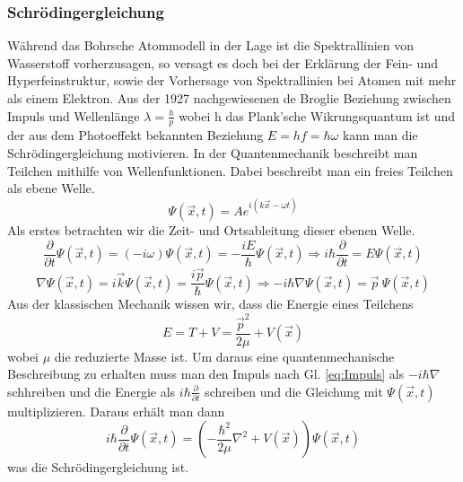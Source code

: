 \documentclass[]{article}
\begin{document}
\subsubsection{Schrödingergleichung}
Während das Bohrsche Atommodell in der Lage ist die Spektrallinien von Wasserstoff vorherzusagen, so versagt es doch bei der Erklärung der Fein- und Hyperfeinstruktur, sowie der Vorhersage von Spektrallinien bei Atomen mit mehr als einem Elektron. Aus der 1927 nachgewiesenen de Broglie Beziehung zwischen Impuls und Wellenlänge $ \lambda=\frac{h}{p} $ wobei h das Plank'sche Wikrungsquantum ist und der aus dem Photoeffekt bekannten Beziehung $ E=hf=\hbar \omega $ kann man die Schrödingergleichung motivieren. In der Quantenmechanik beschreibt man Teilchen mithilfe von Wellenfunktionen. Dabei beschreibt man ein freies Teilchen als ebene Welle.
\begin{equation}
\Psi(\vec{x},t)=A e^{i(k \vec{x}-\omega t)}
\end{equation} 
Als erstes betrachten wir die Zeit- und Ortsableitung dieser ebenen Welle. 
\begin{equation}
\label{eq:Energie} \frac{\partial}{\partial t} \Psi(\vec{x},t)=(-i\omega)  \Psi(\vec{x},t)=-\frac{iE}{\hbar} \Psi(\vec{x},t) \Rightarrow i\hbar \frac{\partial}{\partial t}=E  \Psi(\vec{x},t) \end{equation}
\begin{equation}
\label{eq:Impuls} \nabla  \Psi(\vec{x},t) =i\vec{k} \Psi(\vec{x},t)=\frac{i\vec{p}}{\hbar} \Psi(\vec{x},t) \Rightarrow -i\hbar \nabla  \Psi(\vec{x},t)= \vec{p}    \: \Psi(\vec{x},t) 
\end{equation}
Aus der klassischen Mechanik wissen wir, dass die Energie eines Teilchens \begin{equation} E=T+V=\frac{\vec{p}^2}{2\mu}+V(\vec{x}) 	
\end{equation} 
wobei $\mu$ die reduzierte Masse ist. Um daraus eine quantenmechanische Beschreibung zu erhalten muss man den Impuls nach Gl. \ref{eq:Impuls} als $-i\hbar \nabla$ schhreiben und die Energie als $i \hbar \frac{\partial}{\partial t}$ schreiben und die Gleichung mit $\Psi(\vec{x},t)$ multiplizieren. Daraus erhält man dann 
\begin{equation}
\label{eq:Schrodinger}
i\hbar \frac{\partial}{\partial t}\Psi(\vec{x},t)=(-\frac{\hbar^2}{2\mu}\nabla^2+V(\vec{x})) \Psi(\vec{x},t) 
\end{equation}
was die Schrödingergleichung ist.
\end{document}
